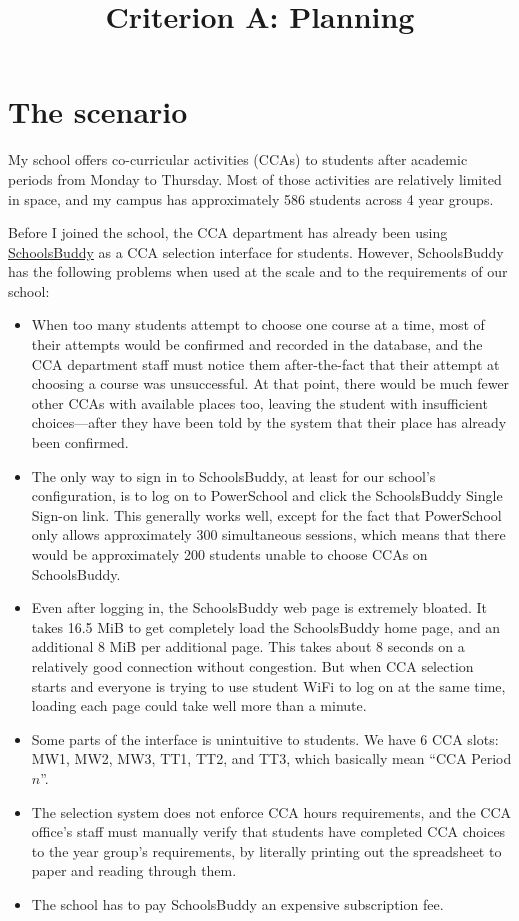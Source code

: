 

\title{Criterion A: Planning}


\maketitle

\section{The scenario}

My school offers co-curricular activities (CCAs) to students after academic
periods from Monday to Thursday. Most of those activities are relatively
limited in space, and my campus has approximately 586 students across 4 year
groups.

Before I joined the school, the CCA department has already been using
\href{https://www.schoolsbuddy.com}{SchoolsBuddy} as a CCA selection interface
for students. However, SchoolsBuddy has the following problems when used at the
scale and to the requirements of our school:

\begin{itemize}
	\item When too many students attempt to choose one course at a time,
		most of their attempts would be confirmed and recorded in the
		database, and the CCA department staff must notice them
		after-the-fact that their attempt at choosing a course was
		unsuccessful. At that point, there would be much fewer other
		CCAs with available places too, leaving the student with
		insufficient choices---after they have been told by the system
		that their place has already been confirmed.
	\item The only way to sign in to SchoolsBuddy, at least for our school's
		configuration, is to log on to PowerSchool and click the
		SchoolsBuddy Single Sign-on link. This generally works well,
		except for the fact that PowerSchool only allows approximately
		300 simultaneous sessions, which means that there would be
		approximately 200 students unable to choose CCAs on
		SchoolsBuddy.
	\item Even after logging in, the SchoolsBuddy web page is extremely
		bloated. It takes 16.5 MiB to get completely load the
		SchoolsBuddy home page,	and an additional 8 MiB per additional
		page. This takes about 8 seconds on a relatively good connection
		without congestion. But when CCA selection starts and everyone
		is trying to use student WiFi to log on at the same time,
		loading each page could take well more than a minute.
	\item Some parts of the interface is unintuitive to students. We have
		6 CCA slots: MW1, MW2, MW3, TT1, TT2, and TT3, which basically
		mean ``CCA Period $n$''.
	\item The selection system does not enforce CCA hours requirements, and
		the CCA office's staff must manually verify that students have
		completed CCA choices to the year group's requirements, by
		literally printing out the spreadsheet to paper and reading
		through them.
	\item The school has to pay SchoolsBuddy an expensive subscription fee.
\end{itemize}

